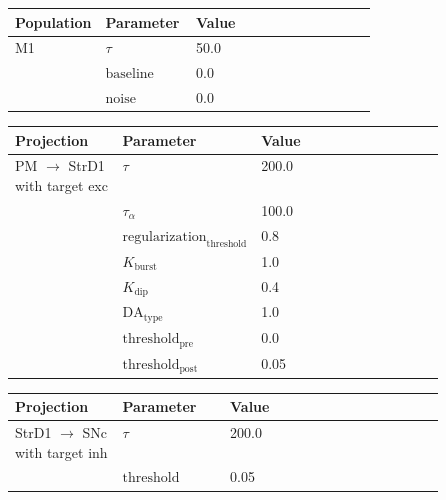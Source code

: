 \documentclass{article}
\begin{document}
\noindent
\begin{tabularx}{\linewidth}{|p{0.25\linewidth}|p{0.25\linewidth}|X|}\hline
\textbf{Population} & \textbf{Parameter} & \textbf{Value}   \\ \hline

    M1             & $\tau$        & 50.0  \\ \hline

                 & ${\text{baseline}}$        & 0.0  \\ \hline

                 & ${\text{noise}}$        & 0.0  \\ \hline

\end{tabularx}

\vspace{2ex}

\noindent
\begin{tabularx}{\linewidth}{|p{0.25\linewidth}|p{0.25\linewidth}|X|}\hline
\textbf{Projection} & \textbf{Parameter} & \textbf{Value}   \\ \hline

    PM  $\rightarrow$ StrD1 with target exc & $\tau$        & 200.0  \\ \hline

     & $\tau_\alpha$        & 100.0  \\ \hline

     & ${\text{regularization}}_{\text{threshold}}$        & 0.8  \\ \hline

     & $K_{\text{burst}}$        & 1.0  \\ \hline

     & $K_{\text{dip}}$        & 0.4  \\ \hline

     & ${\text{DA}}_{\text{type}}$        & 1.0  \\ \hline

     & ${\text{threshold}}_{\text{pre}}$        & 0.0  \\ \hline

     & ${\text{threshold}}_{\text{post}}$        & 0.05  \\ \hline

\end{tabularx}

\vspace{2ex}

\noindent
\begin{tabularx}{\linewidth}{|p{0.25\linewidth}|p{0.25\linewidth}|X|}\hline
\textbf{Projection} & \textbf{Parameter} & \textbf{Value}   \\ \hline

    StrD1  $\rightarrow$ SNc with target inh & $\tau$        & 200.0  \\ \hline

     & ${\text{threshold}}$        & 0.05  \\ \hline

\end{tabularx}
\end{document}
